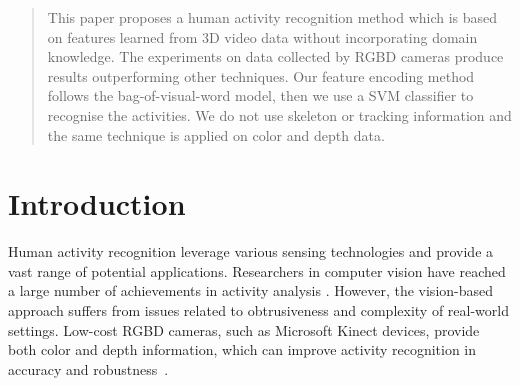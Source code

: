 \documentclass{article}
\begin{document}
 


\begin{abstract} 
This paper proposes a human activity recognition method which is based on features learned from 3D video data without incorporating domain knowledge.
The experiments on data collected by RGBD cameras produce results outperforming other techniques.
Our feature encoding method follows the bag-of-visual-word model, then we use a SVM classifier to recognise the activities.
We do not use skeleton or tracking information and the same technique is applied on color and depth data.
\end{abstract} 

\section{Introduction}
\label{sec:intro}

Human activity recognition leverage various sensing technologies and provide a vast range of potential applications.
Researchers in computer vision have reached a large number of achievements in activity analysis \cite{2011_Ryoo_HumanActivityAnalysis}.
However, the vision-based approach suffers from issues related to obtrusiveness and complexity of real-world settings.
Low-cost RGBD cameras, such as Microsoft Kinect devices, provide both color and depth information, which can improve activity recognition in accuracy and robustness~\cite{2014_Aggarwal_3DReview}.
\end{document}
